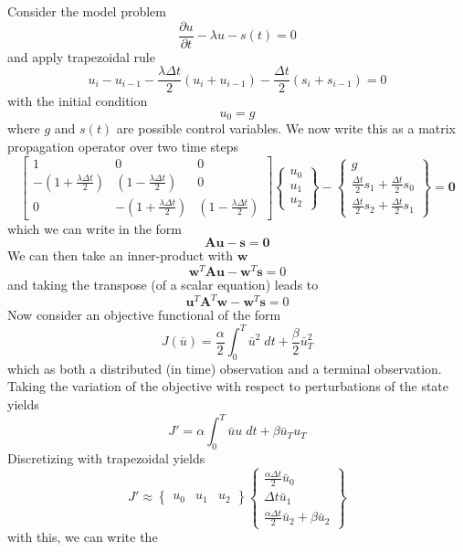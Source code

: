 \documentclass[10pt, oneside]{article}
\newcommand{\vect}[1]{\mathbf{#1}}
\newcommand{\bA}{\vect{A}}
\newcommand{\bu}{\vect{u}}
\newcommand{\bs}{\vect{s}}
\newcommand{\bw}{\vect{w}}
\begin{document}
Consider the model problem
%
\begin{equation} \label{e:model}
\frac{\partial u}{\partial t} - \lambda u - s(t) = 0
\end{equation}
%
and apply trapezoidal rule
%
\[ u_i - u_{i-1} - \frac{\lambda \Delta t}{2}\left( u_i + u_{i-1} \right) - \frac{\Delta t}{2}\left( s_i + s_{i-1}\right) = 0 \]
%
with the initial condition
%
\[ u_0 = g \] 
%
where $g$ and $s(t)$ are possible control variables.  We now write this as a matrix propagation operator over two time steps
%
\[
\begin{bmatrix}
1 & 0 & 0 \\
-(1+\frac{\lambda\Delta t}{2})  &(1-\frac{\lambda\Delta t}{2}) & 0 \\[0.5ex]
0 & -(1+\frac{\lambda\Delta t}{2})  & (1-\frac{\lambda\Delta t}{2})
\end{bmatrix}
\begin{Bmatrix}
u_0 \\ u_1 \\ u_2 
\end{Bmatrix} -
\begin{Bmatrix}
g \\ \frac{\Delta t}{2} s_1 + \frac{\Delta t}{2} s_0  \\[0.5ex] \frac{\Delta t}{2} s_2 + \frac{\Delta t}{2} s_1
\end{Bmatrix} = \vect{0}
\]
which we can write in the form
%
\[ \bA \bu- \bs = \vect{0} \]
%
We can then take an inner-product with $\bw$
%
\[ \bw^T \bA \bu- \bw^T \bs = 0 \]
%
and taking the transpose (of a scalar equation) leads to 
%
\[ \bu^T \bA^T \bw- \bw^T \bs = 0 \]
%
Now consider an objective functional of the form
%
\[ J(\bar u) = \frac{\alpha}{2} \int_0^T \bar u^2 \; dt + \frac{\beta}{2} \bar u_T^2 \]
%
which as both a distributed (in time) observation and a terminal observation. Taking the variation of the objective with respect to perturbations of the state yields
%
\[ J' = \alpha\int_0^T \bar u u \; dt + \beta \bar u_T u_T \]
%
Discretizing with trapezoidal yields
%
\[ J' \approx
\begin{Bmatrix}
u_0 & u_1 & u_2 
\end{Bmatrix}
\begin{Bmatrix}
\frac{\alpha\Delta t}{2} \bar u_0 \\
\Delta t \bar u_1 \\
\frac{\alpha\Delta t}{2} \bar u_2 + \beta \bar u_2
\end{Bmatrix}
\]
%
with this, we can write the 
\end{document}
